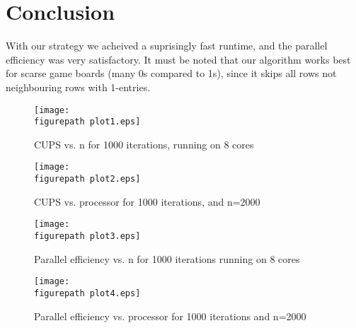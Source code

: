 \section*{Conclusion}

With our strategy we acheived a suprisingly fast runtime, and the parallel efficiency was very satisfactory. It must be noted that our algorithm works best for scarse game boards (many 0s compared to 1s), since it skips all rows not neighbouring rows with 1-entries. 


\begin{figure}[h!] 
 \center 
 \texttt{[image: \\figurepath plot1.eps]}
 \caption{ CUPS vs. n for 1000 iterations, running on 8 cores\label{fig:p1}}
 \end{figure}

\begin{figure}[h!] 
 \center 
 \texttt{[image: \\figurepath plot2.eps]}
 \caption{CUPS vs. processor for 1000 iterations, and n=2000  \label{fig:p2}}
 \end{figure}

\begin{figure}[h!] 
 \center 
 \texttt{[image: \\figurepath plot3.eps]}
 \caption{  Parallel efficiency vs. n for 1000 iterations running on 8 cores\label{fig:p3}}
 \end{figure}

\begin{figure}[h!] 
 \center 
 \texttt{[image: \\figurepath plot4.eps]}
 \caption{ Parallel efficiency vs. processor for 1000 iterations and n=2000 \label{fig:p4}}
 \end{figure}



